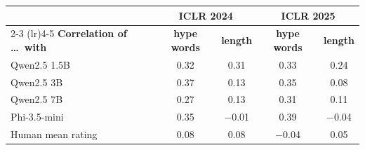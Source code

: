 \begin{tabular}{lcccc}
\toprule
 & \multicolumn{2}{c}{\textbf{ICLR 2024}} & \multicolumn{2}{c}{\textbf{ICLR 2025}} \\
\cmidrule(lr){2-3} \cmidrule(lr){4-5}
\textbf{Correlation of \ldots\ with} & \textbf{hype words} & \textbf{length} & \textbf{hype words} & \textbf{length} \\
\midrule
Qwen2.5 1.5B & 0.32 & 0.31 & 0.33 & 0.24 \\
Qwen2.5 3B & 0.37 & 0.13 & 0.35 & 0.08 \\
Qwen2.5 7B & 0.27 & 0.13 & 0.31 & 0.11 \\
Phi-3.5-mini & 0.35 & $-$0.01 & 0.39 & $-$0.04 \\
\midrule
Human mean rating & 0.08 & 0.08 & $-$0.04 & 0.05 \\
\bottomrule
\end{tabular}
